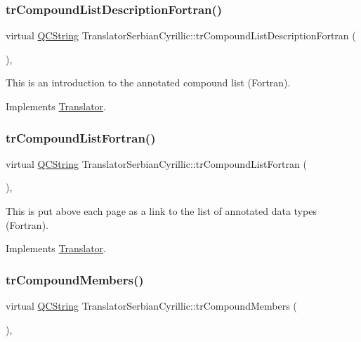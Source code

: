\subsubsection{\texorpdfstring{trCompoundListDescriptionFortran()}{trCompoundListDescriptionFortran()}}
{\footnotesize\ttfamily virtual \mbox{\hyperlink{class_q_c_string}{Q\+C\+String}} Translator\+Serbian\+Cyrillic\+::tr\+Compound\+List\+Description\+Fortran (\begin{DoxyParamCaption}{ }\end{DoxyParamCaption})\hspace{0.3cm}{\ttfamily [inline]}, {\ttfamily [virtual]}}

This is an introduction to the annotated compound list (Fortran). 

Implements \mbox{\hyperlink{class_translator}{Translator}}.

\mbox{\label{class_translator_serbian_cyrillic_af41751117c30cc203e4c8cb9d95aa6db}} 
\subsubsection{\texorpdfstring{trCompoundListFortran()}{trCompoundListFortran()}}
{\footnotesize\ttfamily virtual \mbox{\hyperlink{class_q_c_string}{Q\+C\+String}} Translator\+Serbian\+Cyrillic\+::tr\+Compound\+List\+Fortran (\begin{DoxyParamCaption}{ }\end{DoxyParamCaption})\hspace{0.3cm}{\ttfamily [inline]}, {\ttfamily [virtual]}}

This is put above each page as a link to the list of annotated data types (Fortran). 

Implements \mbox{\hyperlink{class_translator}{Translator}}.

\mbox{\label{class_translator_serbian_cyrillic_af39b610f59d476efd2111fd76a632a59}} 
\subsubsection{\texorpdfstring{trCompoundMembers()}{trCompoundMembers()}}
{\footnotesize\ttfamily virtual \mbox{\hyperlink{class_q_c_string}{Q\+C\+String}} Translator\+Serbian\+Cyrillic\+::tr\+Compound\+Members (\begin{DoxyParamCaption}{ }\end{DoxyParamCaption})\hspace{0.3cm}{\ttfamily [inline]}, {\ttfamily [virtual]}}

